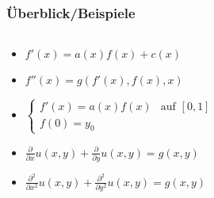 \begin{frame}\frametitle{Überblick/Beispiele}
\small
\begin{columns}[T] %
	\begin{column}{.55\textwidth}
		\begin{itemize}
			\item[] $f'(x)=a(x)f(x)+c(x)$\\\quad
			
			\item[] $f''(x)=g(f'(x),f(x),x)$\\\quad
			
			\item[] $\begin{cases}f'(x)=a(x)f(x) & \text{auf } [0,1]\\ f(0)= y_0 \end{cases}$\\\quad
			
			
			\item[] $\frac{\partial}{\partial x}u(x,y)+\frac{\partial}{\partial y}u(x,y)=g(x,y)$\\\quad
			
			\item[] $\frac{\partial^2}{\partial x^2}u(x,y)+\frac{\partial^2}{\partial y^2}u(x,y)=g(x,y)$\\\quad
			

\end{itemize}
\end{column}
\end{columns}
\end{frame}
